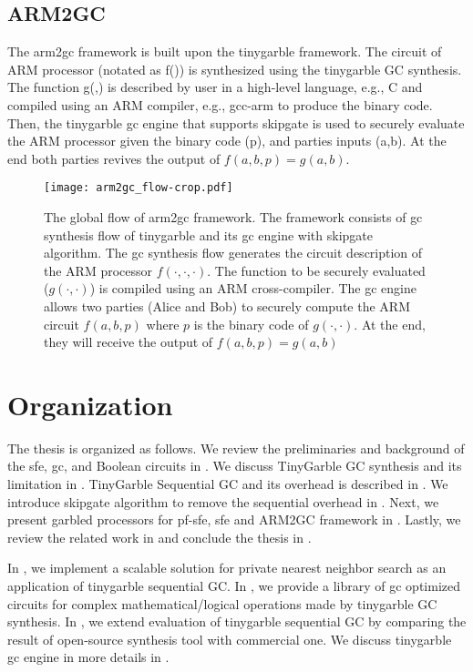 \subsection{ARM2GC}
The \gls{arm2gc} framework is built upon the \gls{tinygarble} framework.
The circuit of ARM processor (notated as f()) is synthesized using the \gls{tinygarble} GC synthesis.
The function g(,) is described by user in a high-level language, e.g., C and compiled using an ARM compiler, e.g., gcc-arm to produce the binary code.
Then, the \gls{tinygarble} gc engine that supports skipgate is used to securely evaluate the ARM processor given the binary code (p), and parties inputs (a,b).
At the end both parties revives the output of $f(a,b,p) = g(a,b)$.

\begin{figure}
\centering
\texttt{[image: arm2gc\_flow-crop.pdf]}
\caption{The global flow of \gls{arm2gc} framework.
The framework consists of \acrshort{gc} synthesis flow of \gls{tinygarble} and its \acrshort{gc} engine with \gls{skipgate} algorithm.
The \acrshort{gc} synthesis flow generates the circuit description of the ARM processor $f(\cdot,\cdot,\cdot)$.
The function to be securely evaluated ($g(\cdot,\cdot)$) is compiled using an ARM cross-compiler.
The \acrshort{gc} engine allows two parties (Alice and Bob) to securely compute the ARM circuit $f(a,b,p)$ where $p$ is the binary code of $g(\cdot,\cdot)$.
At the end, they will receive the output of $f(a,b,p) = g(a,b)$
}
\label{fig:arm2gc-globalflow}
\end{figure}


\section{Organization}
The thesis is organized as follows.
We review the preliminaries and background of the sfe, gc, and Boolean circuits in .
We discuss TinyGarble GC synthesis and its limitation in .
TinyGarble Sequential GC and its overhead is described in .
We introduce skipgate algorithm to remove the sequential overhead in .
Next, we present garbled processors for pf-sfe, sfe and ARM2GC framework in  .
Lastly, we review the related work in  and conclude the thesis in .

In , we implement a scalable solution for private nearest neighbor search as an application of \gls{tinygarble} sequential GC.
In , we provide a library of \acrshort{gc} optimized circuits for complex mathematical/logical operations made by \gls{tinygarble} GC synthesis.
In , we extend evaluation of \gls{tinygarble} sequential GC by comparing the result of open-source synthesis tool with commercial one.
We discuss tinygarble \acrshort{gc} engine in more details in .
